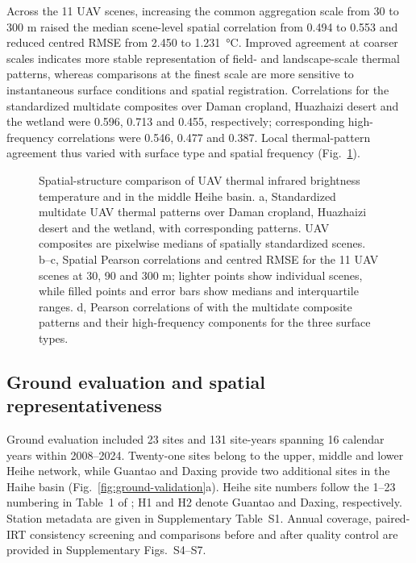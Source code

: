 Across the 11 UAV scenes, increasing the common aggregation scale from 30 to 300 m raised the median scene-level spatial correlation from 0.494 to 0.553 and reduced centred RMSE from 2.450 to 1.231~°C. Improved agreement at coarser scales indicates more stable representation of field- and landscape-scale thermal patterns, whereas comparisons at the finest scale are more sensitive to instantaneous surface conditions and spatial registration. Correlations for the standardized multidate composites over Daman cropland, Huazhaizi desert and the wetland were 0.596, 0.713 and 0.455, respectively; corresponding high-frequency correlations were 0.546, 0.477 and 0.387. Local thermal-pattern agreement thus varied with surface type and spatial frequency (Fig.~\ref*{fig:uav-validation}).

\begin{figure}[H]
\centering
{}
\ReviewFloatBegin
\caption{Spatial-structure comparison of UAV thermal infrared brightness temperature and \chinatherm{} in the middle Heihe basin. a, Standardized multidate UAV thermal patterns over Daman cropland, Huazhaizi desert and the wetland, with corresponding \chinatherm{} patterns. UAV composites are pixelwise medians of spatially standardized scenes. b--c, Spatial Pearson correlations and centred RMSE for the 11 UAV scenes at 30, 90 and 300 m; lighter points show individual scenes, while filled points and error bars show medians and interquartile ranges. d, Pearson correlations of \chinatherm{} with the multidate composite patterns and their high-frequency components for the three surface types.}
\label{fig:uav-validation}
\ReviewFloatEnd
\end{figure}

\subsection{Ground evaluation and spatial representativeness}

Ground evaluation included 23 sites and 131 site-years spanning 16 calendar years within 2008--2024. Twenty-one sites belong to the upper, middle and lower Heihe network, while Guantao and Daxing provide two additional sites in the Haihe basin (Fig.~\ref*{fig:ground-validation}a). Heihe site numbers follow the 1--23 numbering in Table~1 of \textcite{liu2018heiheNetwork}; H1 and H2 denote Guantao and Daxing, respectively. Station metadata are given in Supplementary Table~S1. Annual coverage, paired-IRT consistency screening and comparisons before and after quality control are provided in Supplementary Figs.~S4--S7.

